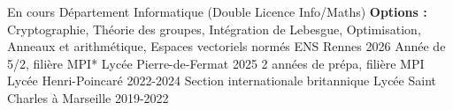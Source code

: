


\begin{cvhonors}

\cvhonor
    {En cours}
    {Département Informatique (Double Licence Info/Maths) \newline \textbf{Options :} Cryptographie, Théorie des groupes, Intégration de Lebesgue, Optimisation, Anneaux et arithmétique, Espaces vectoriels normés}
    {ENS Rennes}
    {2026}
\newline
   \cvhonor
   {}
    {Année de 5/2, filière MPI*}
    {Lycée Pierre-de-Fermat}
    {2025}
\newline
   \cvhonor
  {} %
    {2 années de prépa, filière MPI} %
    { Lycée Henri-Poincaré} %
    {2022-2024} %
\newline
  \cvhonor
    {} %
    {Section internationale britannique} %
    {Lycée Saint Charles à Marseille} %
    {2019-2022} %
    
\end{cvhonors}